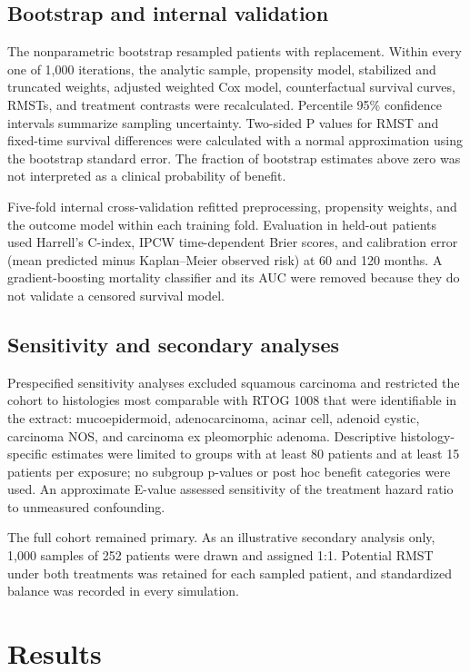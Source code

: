 \documentclass[10pt,twocolumn]{article}
\begin{document}
\subsection{Bootstrap and internal validation}
The nonparametric bootstrap resampled patients with replacement. Within every one of 1,000 iterations, the analytic sample, propensity model, stabilized and truncated weights, adjusted weighted Cox model, counterfactual survival curves, RMSTs, and treatment contrasts were recalculated. Percentile 95\% confidence intervals summarize sampling uncertainty. Two-sided P values for RMST and fixed-time survival differences were calculated with a normal approximation using the bootstrap standard error. The fraction of bootstrap estimates above zero was not interpreted as a clinical probability of benefit.\par
Five-fold internal cross-validation refitted preprocessing, propensity weights, and the outcome model within each training fold. Evaluation in held-out patients used Harrell's C-index, IPCW time-dependent Brier scores, and calibration error (mean predicted minus Kaplan--Meier observed risk) at 60 and 120 months. A gradient-boosting mortality classifier and its AUC were removed because they do not validate a censored survival model.\par
\subsection{Sensitivity and secondary analyses}
Prespecified sensitivity analyses excluded squamous carcinoma and restricted the cohort to histologies most comparable with RTOG 1008 that were identifiable in the extract: mucoepidermoid, adenocarcinoma, acinar cell, adenoid cystic, carcinoma NOS, and carcinoma ex pleomorphic adenoma. Descriptive histology-specific estimates were limited to groups with at least 80 patients and at least 15 patients per exposure; no subgroup p-values or post hoc benefit categories were used. An approximate E-value assessed sensitivity of the treatment hazard ratio to unmeasured confounding.\par
The full cohort remained primary. As an illustrative secondary analysis only, 1,000 samples of 252 patients were drawn and assigned 1:1. Potential RMST under both treatments was retained for each sampled patient, and standardized balance was recorded in every simulation.\par
\section{Results}
\end{document}
